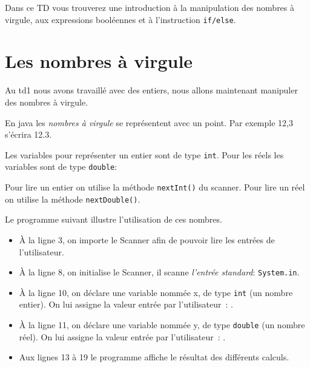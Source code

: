 \documentclass[a4paper,11pt]{article}
\date{2018 -- 2019}
\begin{document}
\entete
\titre
{}
\lastedit


	Dans ce TD vous trouverez une introduction à la manipulation des nombres à virgule,
	aux expressions booléennes et à l'instruction \texttt{if/else}.
	\tableofcontents

	\newpage

\section{Les nombres à virgule}


	Au td1 nous avons travaillé avec des entiers, nous allons maintenant 
	manipuler des nombres à virgule.

	En java les \emph{nombres à virgule} se représentent avec un point. 
	Par exemple 12,3 s'écrira 12.3.

	Les variables pour représenter un entier sont de type \texttt{int}.
	Pour les réels les variables sont de type \texttt{double}:
	

	Pour lire un entier on utilise la méthode \texttt{nextInt()} du scanner.
	Pour lire un réel on utilise la méthode \texttt{nextDouble()}.
	


	Le programme suivant illustre l'utilisation de ces nombres.

	\bigskip

	\begin{itemize}
		\item \`A la ligne 3, on importe le Scanner afin de pouvoir lire les entrées de l'utilisateur.
		\item \`A la ligne 8, on initialise le Scanner, il scanne \emph{l'entrée standard}: 
			\texttt{System.in}.

		\item \`A la ligne 10, on déclare une variable nommée x, de type \texttt{int} (un nombre entier). 
			On lui assigne la valeur entrée par l'utilisateur~: .

		\item \`A la ligne 11, on déclare une variable nommée y, de type \texttt{double} (un nombre réel).
			On lui assigne la valeur entrée par l'utilisateur~: .

		\item Aux lignes 13 à 19 le programme affiche le résultat des différents calculs.

	\end{itemize}
\end{document}
